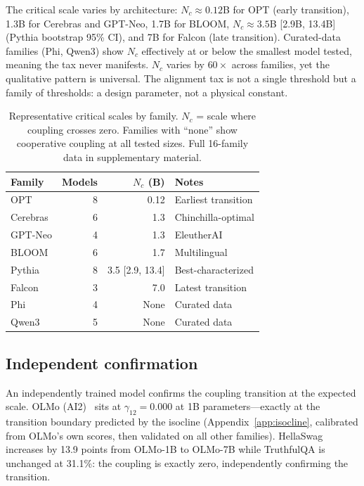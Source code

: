 \documentclass{article}
\begin{document}
The critical scale varies by architecture:
$N_c \approx 0.12$B for OPT (early transition),
1.3B for Cerebras and GPT-Neo,
1.7B for BLOOM,
$N_c \approx 3.5$B [2.9B, 13.4B] (Pythia bootstrap 95\% CI),
and 7B for Falcon (late transition).
Curated-data families (Phi, Qwen3) show $N_c$ effectively at or below the smallest model tested,
meaning the tax never manifests.
$N_c$ varies by $60\times$ across families, yet the qualitative pattern is universal.
The alignment tax is not a single threshold
but a family of thresholds: a design parameter, not a physical constant.

\begin{table}[h]
\centering
\caption{Representative critical scales by family. $N_c$ = scale where coupling crosses zero.
Families with ``none'' show cooperative coupling at all tested sizes.
Full 16-family data in supplementary material.}
\label{tab:nc}
\begin{tabular}{lrrl}
\toprule
Family & Models & $N_c$ (B) & Notes \\
\midrule
OPT & 8 & 0.12 & Earliest transition \\
Cerebras & 6 & 1.3 & Chinchilla-optimal \\
GPT-Neo & 4 & 1.3 & EleutherAI \\
BLOOM & 6 & 1.7 & Multilingual \\
Pythia & 8 & 3.5 [2.9, 13.4] & Best-characterized \\
Falcon & 3 & 7.0 & Latest transition \\
Phi & 4 & None & Curated data \\
Qwen3 & 5 & None & Curated data \\
\bottomrule
\end{tabular}
\end{table}

\subsection{Independent confirmation}

An independently trained model confirms the coupling transition at the expected scale.
OLMo (AI2)~\cite{groeneveld2024} sits at $\gamma_{12} = 0.000$ at 1B parameters---exactly
at the transition boundary predicted by the isocline (Appendix~\ref{app:isocline},
calibrated from OLMo's own scores, then validated on all other families).
HellaSwag increases by 13.9 points from OLMo-1B to OLMo-7B while TruthfulQA
is unchanged at 31.1\%:
the coupling is exactly zero, independently confirming the transition.
\end{document}
